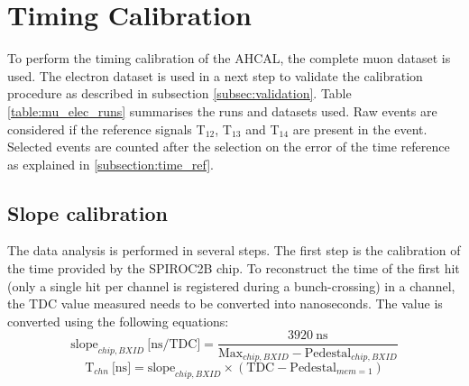 \section{Timing Calibration}

To perform the timing calibration of the AHCAL, the complete muon dataset is used. The electron dataset is used in a next step to validate the calibration procedure as described in subsection \ref{subsec:validation}. Table \ref{table:mu_elec_runs} summarises the runs and datasets used. Raw events are considered if the reference signals T$_{12}$,  T$_{13}$ and T$_{14}$ are present in the event. Selected events are counted after the selection on the error of the time reference as explained in \ref{subsection:time_ref}.
\begin{table}[htbp]
\centering
{}
  \caption{Table with the statistic before and after selection used for timing calibration.}
  \label{table:mu_elec_runs}
\end{table}

\subsection{Slope calibration}
\label{subsec:slope_calib}

The data analysis is performed in several steps. The first step is the calibration of the time provided by the SPIROC2B chip. To reconstruct the time of the first hit (only a single hit per channel is registered during a bunch-crossing) in a channel, the TDC value measured needs to be converted into nanoseconds. The value is converted using the following equations:
\begin{equation} \label{eq:slope}
\text{slope}_{chip, BXID} \: \text{[ns/TDC]} = \frac{3920 \: \text{ns}}{\text{Max}_{chip, BXID} - \text{Pedestal}_{chip, BXID}}
\end{equation}
\begin{equation} \label{eq:time_chn}
\text{T}_{chn} \: \text{[ns]} = \text{slope}_{chip, BXID} \times (\text{TDC} - \text{Pedestal}_{mem=1} )
\end{equation}

